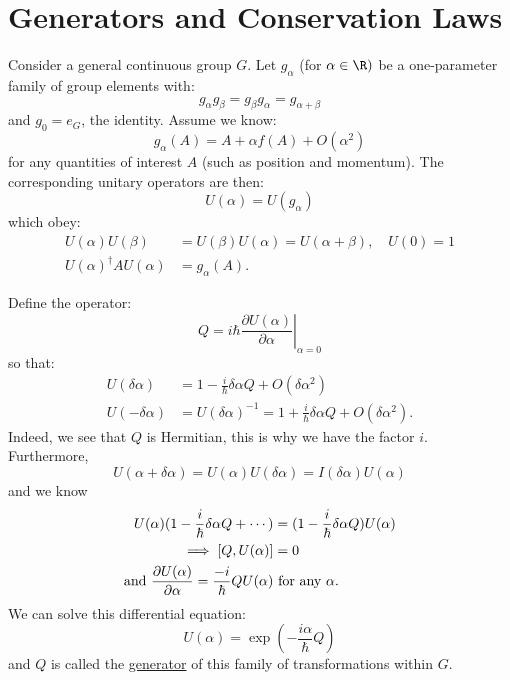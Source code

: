 \documentclass[../Main.tex]{subfiles}
\begin{document}
\section{Generators and Conservation Laws}
Consider a general continuous group $G$. Let $g_\alpha$ (for $\alpha \in \R)$ be a one-parameter family of group elements with:
\begin{equation*}
    g_\alpha g_\beta = g_\beta g_\alpha = g_{\alpha + \beta}
\end{equation*}
and $g_0 = e_G$, the identity. Assume we know:
\begin{equation*}
    g_\alpha(A) = A + \alpha f(A) + O(\alpha^2)
\end{equation*}
for any quantities of interest $A$ (such as position and momentum). The corresponding unitary operators are then:
\begin{equation*}
    U(\alpha) = U(g_\alpha)
\end{equation*}
which obey:
\begin{align*}
    U(\alpha) U(\beta) &= U(\beta) U(\alpha) = U(\alpha + \beta),\quad U(0) = 1 \\
    U(\alpha)^\dagger A U(\alpha) &= g_\alpha(A).
\end{align*}

Define the operator:
\begin{equation*}
    Q = i\hbar \left.\frac{\partial U(\alpha)}{\partial \alpha}\right|_{\alpha = 0}
\end{equation*}
so that:
\begin{align*}
    U(\delta\alpha) &= 1 - \frac{i}{\hbar} \delta\alpha Q + O(\delta\alpha^2) \\
    U(-\delta\alpha) &= U(\delta\alpha)^{-1} = 1 + \frac{i}{\hbar} \delta\alpha Q + O(\delta\alpha^2).
\end{align*}
Indeed, we see that $Q$ is Hermitian, this is why we have the factor $i$. Furthermore,
\begin{equation*}
    U(\alpha+\delta\alpha) = U(\alpha) U(\delta\alpha) = I(\delta\alpha) U(\alpha)
\end{equation*}
and we know
\begin{align*}
    U(\alpha) (1-\frac i \hbar \delta\alpha Q + \cdots) &= (1 - \frac i \hbar \delta\alpha Q) U(\alpha) \\
    \implies \left[Q, U(\alpha)\right] &= 0 \\
    \text{and } \frac{\partial U(\alpha)}{\partial \alpha} = \frac{-i}{\hbar} QU(\alpha) &\text{ for any } \alpha.
\end{align*} 
We can solve this differential equation:
\begin{equation*}
    U(\alpha) = \exp\left(-\frac{i\alpha}{\hbar}Q\right)
\end{equation*}
and $Q$ is called the \underline{generator} of this family of transformations within $G$.
\end{document}
